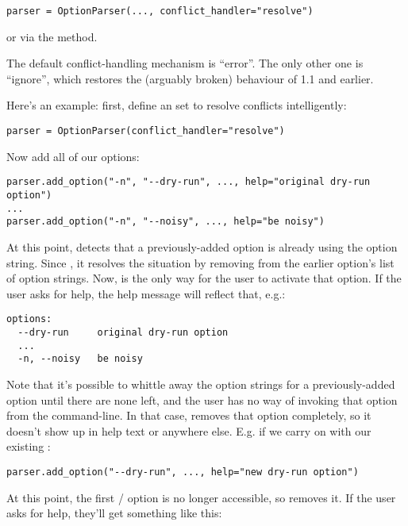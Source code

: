 \begin{verbatim}
parser = OptionParser(..., conflict_handler="resolve")
\end{verbatim}

or via the  method.

The default conflict-handling mechanism is ``error''.  The only other
one is ``ignore'', which restores the (arguably broken) behaviour of
 1.1 and earlier.

Here's an example: first, define an  set to
resolve conflicts intelligently:

\begin{verbatim}
parser = OptionParser(conflict_handler="resolve")
\end{verbatim}

Now add all of our options:

\begin{verbatim}
parser.add_option("-n", "--dry-run", ..., help="original dry-run option")
...
parser.add_option("-n", "--noisy", ..., help="be noisy")
\end{verbatim} 

At this point,  detects that a previously-added option is already
using the  option string.  Since , it resolves the situation by removing 
from the earlier option's list of option strings.  Now,
 is the only way for the user to activate that
option.  If the user asks for help, the help message will reflect
that, e.g.:

\begin{verbatim}
options:
  --dry-run     original dry-run option
  ...
  -n, --noisy   be noisy
\end{verbatim}

Note that it's possible to whittle away the option strings for a
previously-added option until there are none left, and the user has no
way of invoking that option from the command-line.  In that case,
 removes that option completely, so it doesn't show
up in help text or anywhere else.  E.g. if we carry on with our
existing :

\begin{verbatim}
parser.add_option("--dry-run", ..., help="new dry-run option")
\end{verbatim}

At this point, the first /
option is no longer accessible, so  removes it.  If
the user asks for help, they'll get something like this:

